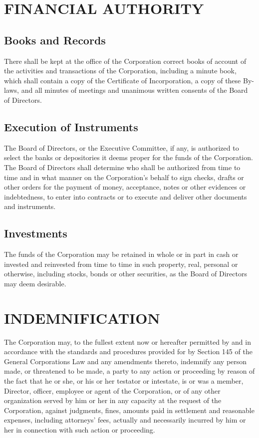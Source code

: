 \documentclass{article}
\begin{document}
\section{FINANCIAL AUTHORITY}
\subsection{Books and Records}
There shall be kept at the office of the Corporation correct books of account of the activities and transactions of the Corporation, including a minute book, which shall contain a copy of the Certificate of Incorporation, a copy of these By-laws, and all minutes of meetings and unanimous written consents of the Board of Directors.
\subsection{Execution of Instruments}
The Board of Directors, or the Executive Committee, if any, is authorized to select the banks or depositories it deems proper for the funds of the Corporation.  The Board of Directors shall determine who shall be authorized from time to time and in what manner on the Corporation’s behalf to sign checks, drafts or other orders for the payment of money, acceptance, notes or other evidences or indebtedness, to enter into contracts or to execute and deliver other documents and instruments.
\subsection{Investments}
The funds of the Corporation may be retained in whole or in part in cash or invested and reinvested from time to time in such property, real, personal or otherwise, including stocks, bonds or other securities, as the Board of Directors may deem desirable.
\section{INDEMNIFICATION}
The Corporation may, to the fullest extent now or hereafter permitted by and in accordance with the standards and procedures provided for by Section 145 of the General Corporations Law and any amendments thereto, indemnify any person made, or threatened to be made, a party to any action or proceeding by reason of the fact that he or she, or his or her testator or intestate, is or was a member, Director, officer, employee or agent of the Corporation, or of any other organization served by him or her in any capacity at the request of the Corporation, against judgments, fines, amounts paid in settlement and reasonable expenses, including attorneys’ fees, actually and necessarily incurred by him or her in connection with such action or proceeding.
\end{document}
